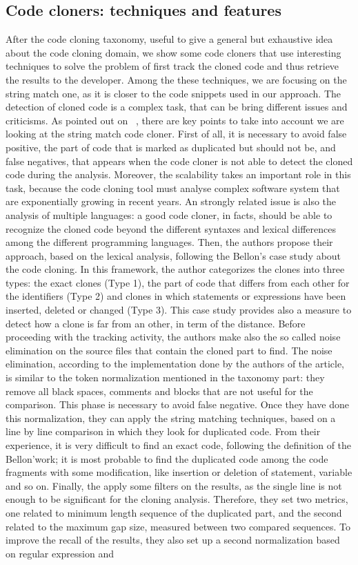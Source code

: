 \subsection{Code cloners: techniques and features}
After the code cloning taxonomy, useful to give a general but exhaustive idea about the code cloning domain, we show some code cloners that use interesting techniques to solve the problem of first track the cloned code and thus retrieve the results to the developer. Among the these techniques, we are focusing on the string match one, as it is closer to the code snippets used in our approach. The detection of cloned code is a complex task, that can be bring different issues and criticisms. As pointed out on ~\cite{stephane_ducasse_effectiveness_2005}, there are key points to take into account we are looking at the string match code cloner. First of all, it is necessary to avoid false positive, the part of code that is marked as duplicated but should not be, and false negatives, that appears when the code cloner is not able to detect the cloned code during the analysis. Moreover, the scalability takes an important role in this task, because the code cloning tool must analyse complex software system that are exponentially growing in recent years. An strongly related issue is also the analysis of multiple languages: a good code cloner, in facts, should be able to recognize the cloned code beyond the different syntaxes and lexical differences among the different programming languages. Then, the authors propose their approach, based on the lexical analysis, following the Bellon's case study about the code cloning. In this framework, the author categorizes the clones into three types: the exact clones (Type 1), the part of code that differs from each other for the identifiers (Type 2) and clones in which statements or expressions have been inserted, deleted or changed (Type 3). This case study provides also a measure to detect how a clone is far from an other, in term of the distance. Before proceeding with the tracking activity, the authors make also the so called noise elimination on the source files that contain the cloned part to find. The noise elimination, according to the implementation done by the authors of the article, is similar to the token normalization mentioned in the taxonomy part: they remove all black spaces, comments and blocks that are not useful for the comparison. This phase is necessary to avoid false negative. Once they have done this normalization, they can apply the string matching techniques, based on a line by line comparison in which they look for duplicated code. From their experience, it is very difficult to find an exact code, following the definition of the Bellon'work; it is most probable to find the duplicated code among the code fragments with some modification, like insertion or deletion of statement, variable and so on. Finally, the apply some filters on the results, as the single line is not enough to be significant for the cloning analysis. Therefore, they set two metrics, one related to minimum length sequence of the duplicated part, and the second related to the maximum gap size, measured between two compared sequences. To improve the recall of the results, they also set up a second normalization based on regular expression and 